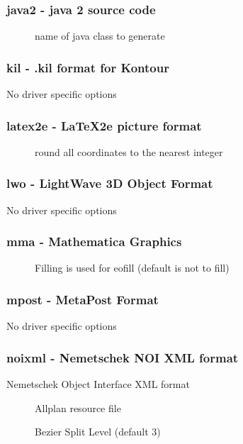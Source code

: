 \documentclass[english,a4paper]{article}
\begin{document}
\subsubsection{java2 - java 2 source code}
\begin{description}
\item[] 
name of java class to generate


\end{description}
\subsubsection{kil - .kil format for Kontour}
No driver specific options
\subsubsection{latex2e - LaTeX2e picture format}
\begin{description}
\item[] 
round all coordinates to the nearest integer


\end{description}
\subsubsection{lwo - LightWave 3D Object Format}
No driver specific options
\subsubsection{mma - Mathematica Graphics}
\begin{description}
\item[] 
Filling is used for eofill (default is not to fill)


\end{description}
\subsubsection{mpost - MetaPost Format}
No driver specific options
\subsubsection{noixml - Nemetschek NOI XML format}
Nemetschek Object Interface XML format

\begin{description}
\item[] 
Allplan resource file


\item[] 
Bezier Split Level (default 3)


\end{description}
\end{document}
